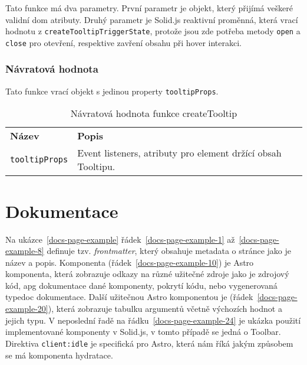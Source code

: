 Tato funkce má dva parametry.
První parametr je objekt, který přijímá veškeré validní \gls{dom} atributy.
Druhý parametr je Solid.js reaktivní proměnná, která vrací hodnotu z \texttt{createTooltipTriggerState}, protože jsou zde potřeba metody \texttt{open} a \texttt{close} pro otevření, respektive zavření obsahu při hover interakci.

\subsubsection{Návratová hodnota}

Tato funkce vrací objekt s jedinou property \texttt{tooltipProps}.

\begin{table}[ht]
    \begin{ctucolortab}
        \begin{tabularx}{\textwidth}{p{3cm} X}
            \bfseries Název       & \bfseries Popis                                              \\\Midrule{}
            \texttt{tooltipProps} & Event listeners, atributy pro element držící obsah Tooltipu.
        \end{tabularx}
    \end{ctucolortab}
    \caption{Návratová hodnota funkce createTooltip}
    \label{table:tooltip-return}
\end{table}

\clearpage

\section{Dokumentace}

Na ukázce~\ref{docs-page-example} řádek~\ref{docs-page-example-1} až~\ref{docs-page-example-8} definuje tzv. \textit{frontmatter}, který obsahuje metadata o stránce jako je název a popis.
Komponenta  (řádek~\ref{docs-page-example-10}) je Astro komponenta, která zobrazuje odkazy na různé užitečné zdroje jako je zdrojový kód, \gls{apg} dokumentace dané komponenty, pokrytí kódu, nebo vygenerovaná typedoc dokumentace.
Další užitečnou Astro komponentou je  (řádek~\ref{docs-page-example-20}), která zobrazuje tabulku argumentů včetně výchozích hodnot a jejich typu.
V neposlední řadě na řádku~\ref{docs-page-example-24} je ukázka použití implementované komponenty v Solid.js, v tomto případě se jedná o Toolbar.
Direktiva \texttt{client:idle} je specifická pro Astro, která nám říká jakým způsobem se má komponenta \gls{hydratace}.

